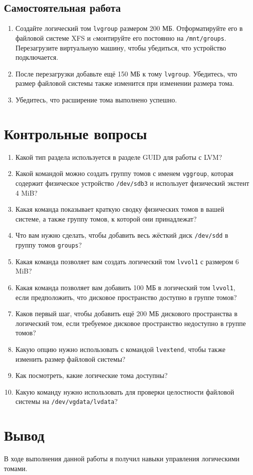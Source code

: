 \documentclass[12pt]{article}
\begin{document}
\subsection{Самостоятельная работа}
\begin{enumerate}
	\item Создайте логический том \texttt{lvgroup} размером 200 МБ. Отформатируйте его в
	      файловой системе XFS и cмонтируйте его постоянно на \texttt{/mnt/groups}. Перезагрузите
	      виртуальную машину, чтобы убедиться, что устройство подключается.
	\item После перезагрузки добавьте ещё 150 МБ к тому \texttt{lvgroup}. Убедитесь, что размер
	      файловой системы также изменится при изменении размера тома.
	\item Убедитесь, что расширение тома выполнено успешно.
\end{enumerate}

\section{Контрольные вопросы}
\begin{enumerate}
	\item Какой тип раздела используется в разделе GUID для работы с LVM?
	\item Какой командой можно создать группу томов с именем \texttt{vggroup}, которая содержит
	      физическое устройство \texttt{/dev/sdb3} и использует физический экстент 4 MiB?
	\item Какая команда показывает краткую сводку физических томов в вашей системе,
	      а также группу томов, к которой они принадлежат?
	\item Что вам нужно сделать, чтобы добавить весь жёсткий диск \texttt{/dev/sdd} в группу
	      томов \texttt{groups}?
	\item Какая команда позволяет вам создать логический том \texttt{lvvol1} с размером 6 MiB?
	\item Какая команда позволяет вам добавить 100 МБ в логический том \texttt{lvvol1}, если
	      предположить, что дисковое пространство доступно в группе томов?
	\item Каков первый шаг, чтобы добавить ещё 200 МБ дискового пространства в
	      логический том, если требуемое дисковое пространство недоступно в группе томов?
	\item Какую опцию нужно использовать с командой \texttt{lvextend}, чтобы также изменить
	      размер файловой системы?
	\item Как посмотреть, какие логические тома доступны?
	\item Какую команду нужно использовать для проверки целостности файловой системы
	      на \texttt{/dev/vgdata/lvdata}?
\end{enumerate}

\section{Вывод}
В ходе выполнения данной работы я получил навыки управления логическими томами.
\end{document}
